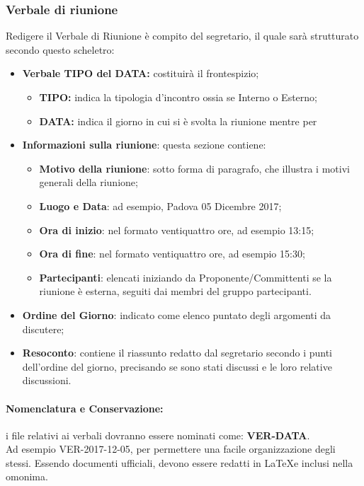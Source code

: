\documentclass[NormeDiProgetto.tex]{subfiles}
\begin{document}
	\subsubsection{Verbale di riunione}
	Redigere il Verbale di Riunione è compito del segretario, il quale sarà strutturato secondo questo scheletro:
	\begin{itemize}
		\item \textbf{Verbale TIPO del DATA:} costituirà il frontespizio;
		\begin{itemize}
			\item \textbf{TIPO:} indica la tipologia d'incontro ossia se Interno o Esterno;
			\item \textbf{DATA:} indica il giorno in cui si è svolta la riunione mentre per 
		\end{itemize}
		\item \textbf{Informazioni sulla riunione}: questa sezione contiene:
		\begin{itemize}
			\item \textbf{Motivo della riunione}: sotto forma di paragrafo, che illustra i motivi generali della riunione; 
			\item \textbf{Luogo e Data}: ad esempio, Padova 05 Dicembre 2017;
			\item \textbf{Ora di inizio}: nel formato ventiquattro ore, ad esempio 13:15;
			\item \textbf{Ora di fine}: nel formato ventiquattro ore, ad esempio 15:30;
			\item \textbf{Partecipanti}: elencati iniziando da Proponente/Committenti se la riunione è esterna, seguiti dai membri del gruppo partecipanti.			\end{itemize}
			\item \textbf{Ordine del Giorno}: indicato come elenco puntato degli argomenti da discutere;
			\item \textbf{Resoconto}: contiene il riassunto redatto dal segretario secondo i punti dell'ordine del giorno, precisando se sono stati discussi e le loro relative discussioni.
	\end{itemize}
	\paragraph{Nomenclatura e Conservazione:} i file relativi ai verbali dovranno essere nominati come: \textbf{VER-DATA}.\\
	Ad esempio VER-2017-12-05, per permettere una facile organizzazione degli stessi.
	Essendo documenti ufficiali, devono essere redatti in \LaTeX e inclusi nella  omonima.
	
\end{document}
